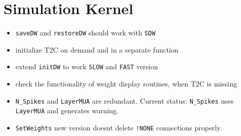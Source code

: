 \documentclass[12pt]{article}
\begin{document}
\section{Simulation Kernel}
\begin{itemize}
\item \texttt{saveDW} and \texttt{restoreDW} should work with \texttt{SDW}
\item initialize T2C on demand and in a separate function
\item extend \texttt{initDW} to work \texttt{SLOW} and \texttt{FAST} version
\item check the functionality of weight display routines, when T2C is missing
\item \texttt{N_Spikes} and \texttt{LayerMUA} are redundant. Current status: \texttt{N_Spikes} uses \texttt{LayerMUA} and generates warning.
\item \texttt{SetWeights} new version doesnt delete \texttt{!NONE} connections properly.
\end{itemize}
\end{document}
